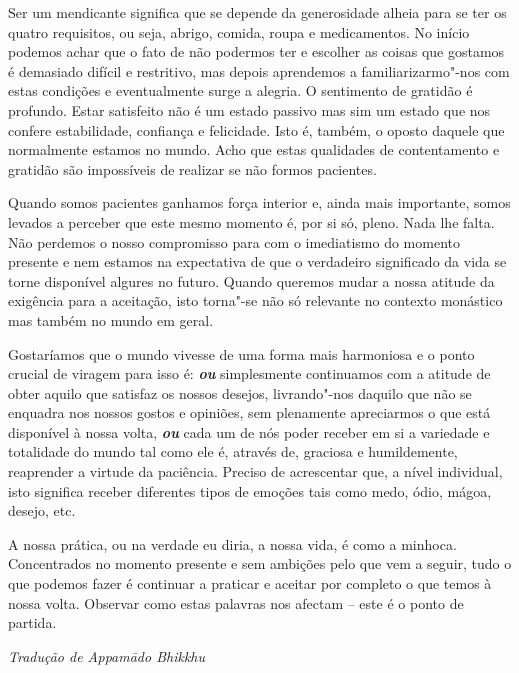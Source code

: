 Ser um mendicante significa que se depende da generosidade alheia para
se ter os quatro requisitos, ou seja, abrigo, comida, roupa e
medicamentos. No início podemos achar que o fato de não podermos ter e
escolher as coisas que gostamos é demasiado difícil e restritivo, mas
depois aprendemos a familiarizarmo"-nos com estas condições e
eventualmente surge a alegria. O sentimento de gratidão é profundo.
Estar satisfeito não é um estado passivo mas sim um estado que nos
confere estabilidade, confiança e felicidade. Isto é, também, o oposto
daquele que normalmente estamos no mundo. Acho que estas qualidades de
contentamento e gratidão são impossíveis de realizar se não formos
pacientes.

Quando somos pacientes ganhamos força interior e, ainda mais importante,
somos levados a perceber que este mesmo momento é, por si só, pleno.
Nada lhe falta. Não perdemos o nosso compromisso para com o imediatismo
do momento presente e nem estamos na expectativa de que o verdadeiro
significado da vida se torne disponível algures no futuro. Quando
queremos mudar a nossa atitude da exigência para a aceitação, isto
torna"-se não só relevante no contexto monástico mas também no mundo em
geral.

Gostaríamos que o mundo vivesse de uma forma mais harmoniosa e o ponto
crucial de viragem para isso é: \emph{\textbf{ou}} simplesmente
continuamos com a atitude de obter aquilo que satisfaz os nossos
desejos, livrando"-nos daquilo que não se enquadra nos nossos gostos e
opiniões, sem plenamente apreciarmos o que está disponível à nossa
volta, \emph{\textbf{ou}} cada um de nós poder receber em si a variedade
e totalidade do mundo tal como ele é, através de, graciosa e
humildemente, reaprender a virtude da paciência. Preciso de acrescentar
que, a nível individual, isto significa receber diferentes tipos de
emoções tais como medo, ódio, mágoa, desejo, etc.

A nossa prática, ou na verdade eu diria, a nossa vida, é como a minhoca.
Concentrados no momento presente e sem ambições pelo que vem a seguir,
tudo o que podemos fazer é continuar a praticar e aceitar por completo o
que temos à nossa volta. Observar como estas palavras nos afectam --
este é o ponto de partida.

\bigskip

{\raggedleft\itshape
  Tradução de Appamādo Bhikkhu
\par}
